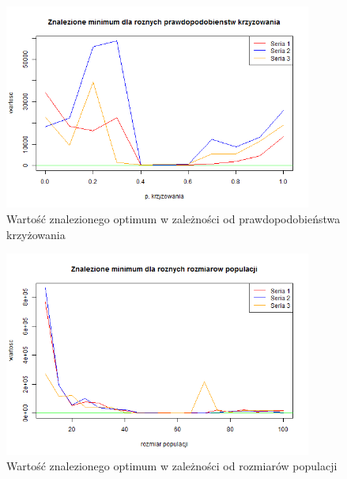 \documentclass[11pt, a4paper]{article}
\begin{document}
\begin{figure}[H]
	\begin{center}
		\includegraphics[width=0.9\textwidth]{./assets/PriceTransistor3.png} %
		\caption{Wartość znalezionego optimum w zależności od prawdopodobieństwa krzyżowania}
		\label{fig:pricetransistor3}
	\end{center}
\end{figure}

\begin{figure}[H]
	\begin{center}
		\includegraphics[width=0.9\textwidth]{./assets/PriceTransistor4.png} %
		\caption{Wartość znalezionego optimum w zależności od rozmiarów populacji}
		\label{fig:pricetransistor4}
	\end{center}
\end{figure}
\end{document}
